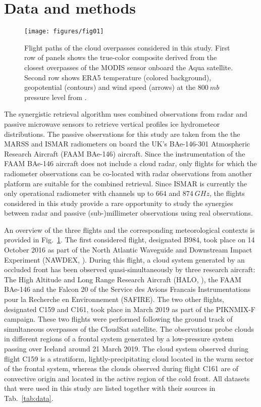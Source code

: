 \documentclass[journal abbreviation, manuscript]{copernicus}
\begin{document}
\section{Data and methods}
\label{sec:methods_and_data}

\begin{figure}[h!]
  \centering \texttt{[image: figures/fig01]}
  \caption{Flight paths of the cloud overpasses considered in this study. First
    row of panels shows the true-color composite derived from the closest
    overpasses of the MODIS \citep{modis} sensor onboard the Aqua satellite.
    Second row shows ERA5 temperature (colored background),
    geopotential (contours) and wind speed (arrows) at the $800\ \unit{mb}$
    pressure level from \citet{era5}.}
  \label{fig:flight_overview}
\end{figure}

The synergistic retrieval algorithm uses combined observations from radar and
passive microwave sensors to retrieve vertical profiles ice hydrometeor
distributions. The passive observations for this study are taken from the the
MARSS \citep{mcgrath01} and ISMAR \citep{fox17} radiometers on board the UK’s
BAe-146-301 Atmospheric Research Aircraft (FAAM BAe-146) aircraft. Since the
instrumentation of the FAAM BAe-146 aircraft does not include a cloud radar,
only flights for which the radiometer observations can be co-located with radar
observations from another platform are suitable for the combined retrieval.
Since ISMAR is currently the only operational radiometer with channels up to
$664$ and $874\ \unit{GHz}$, the flights considered in this study provide a rare
opportunity to study the synergies between radar and passive (sub-)millimeter
observations using real observations.

An overview of the three flights and the corresponding meteorological contexts
is provided in Fig.~\ref{fig:flight_overview}. The first considered flight,
designated B984, took place on 14 October 2016 as part of the North Atlantic
Waveguide and Downstream Impact Experiment (NAWDEX, \citet{schafler18}). During
this flight, a cloud system generated by an occluded front has been observed
quasi-simultaneously by three research aircraft: The High Altitude and Long
Range Research Aircraft (HALO, \citet{krautstrunk12}), the FAAM BAe-146 and the
Falcon 20 of the Service des Avions Francais Instrumentations pour la Recherche
en Environnement (SAFIRE). The two other flights, designated C159 and C161, took
place in March 2019 as part of the PIKNMIX-F campaign. These two flights were
performed following the ground track of simultaneous overpasses of the CloudSat
satellite. The observations probe clouds in different regions of a frontal
system generated by a low-pressure system passing over Iceland around 21 March
2019. The cloud system observed during flight C159 is a stratiform,
lightly-precipitating cloud located in the warm sector of the frontal system,
whereas the clouds observed during flight C161 are of convective origin and
located in the active region of the cold front. All datasets that were used in
this study are listed together with their sources in Tab.~\ref{tab:data}.
\end{document}
